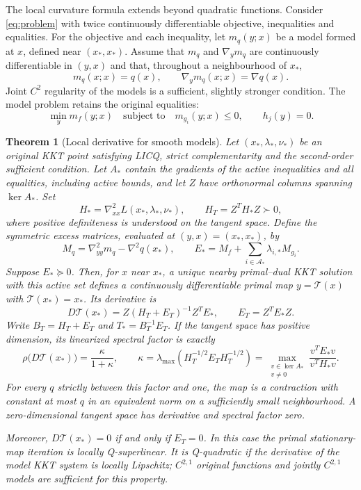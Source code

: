 \documentclass[pdflatex,sn-mathphys-num]{sn-jnl}
\theoremstyle{thmstyleone}
\newtheorem{theorem}{Theorem}[section]
\theoremstyle{thmstylethree}
\begin{document}
The local curvature formula extends beyond quadratic functions. Consider
\eqref{eq:problem} with twice continuously differentiable objective,
inequalities and equalities. For the objective and each inequality, let
$m_q(y;x)$ be a model formed at $x$, defined near $(x_*,x_*)$. Assume that
$m_q$ and $\nabla_y m_q$ are continuously differentiable in $(y,x)$ and that,
throughout a neighbourhood of $x_*$,
\begin{equation}\label{eq:smooth-model-matching}
 m_q(x;x)=q(x),\qquad \nabla_y m_q(x;x)=\nabla q(x).
\end{equation}
Joint $C^2$ regularity of the models is a sufficient, slightly stronger
condition. The model problem retains the original equalities:
\[
 \min_y m_f(y;x)\quad\text{subject to}\quad
 m_{g_i}(y;x)\leq0,\qquad h_j(y)=0.
\]

\begin{theorem}[Local derivative for smooth models]
\label{thm:smooth-anchored-map}
Let $(x_*,\lambda_*,\nu_*)$ be an original KKT point satisfying LICQ,
strict complementarity and the second-order sufficient condition.
Let $A_*$ contain the gradients of the active inequalities and all
equalities, including active bounds, and let $Z$ have orthonormal columns
spanning $\ker A_*$. Set
\[
 H_*=\nabla^2_{xx}L(x_*,\lambda_*,\nu_*),\qquad H_T=Z^TH_*Z\succ0,
\]
where positive definiteness is understood on the tangent space. Define
the symmetric excess matrices, evaluated at $(y,x)=(x_*,x_*)$, by
\[
 M_q=\nabla^2_{yy}m_q-\nabla^2q(x_*),\qquad
 E_*=M_f+\sum_{i\in\mathcal A_*}\lambda_{i,*}M_{g_i}.
\]
Suppose $E_*\succeq0$. Then, for $x$ near $x_*$, a unique nearby primal--dual KKT solution
with this active set defines a continuously differentiable primal map $y=\mathcal T(x)$ with $\mathcal T(x_*)=x_*$.
Its derivative is
\begin{equation}\label{eq:smooth-model-derivative}
 D\mathcal T(x_*)=Z(H_T+E_T)^{-1}Z^TE_*,\qquad E_T=Z^TE_*Z.
\end{equation}
Write $B_T=H_T+E_T$ and $T_*=B_T^{-1}E_T$.
If the tangent space has positive dimension, its linearized spectral
factor is exactly
\begin{equation}\label{eq:smooth-model-kappa}
 \rho\bigl(D\mathcal T(x_*)\bigr)=\frac{\kappa}{1+\kappa},\qquad
 \kappa=\lambda_{\max}(H_T^{-1/2}E_TH_T^{-1/2})
 =\max_{\substack{v\in\ker A_*\\v\ne0}}
       \frac{v^TE_*v}{v^TH_*v}.
\end{equation}
For every $q$ strictly between this factor and one, the map is a
contraction with constant at most $q$ in an equivalent norm on a
sufficiently small neighbourhood. A zero-dimensional tangent space has
derivative and spectral factor zero.

Moreover, $D\mathcal T(x_*)=0$ if and only if $E_T=0$. In this case the
primal stationary-map iteration is locally Q-superlinear. It is
Q-quadratic if the derivative of the model KKT system is locally
Lipschitz; $C^{2,1}$ original functions and jointly $C^{2,1}$ models
are sufficient for this property.
\end{theorem}
\end{document}
